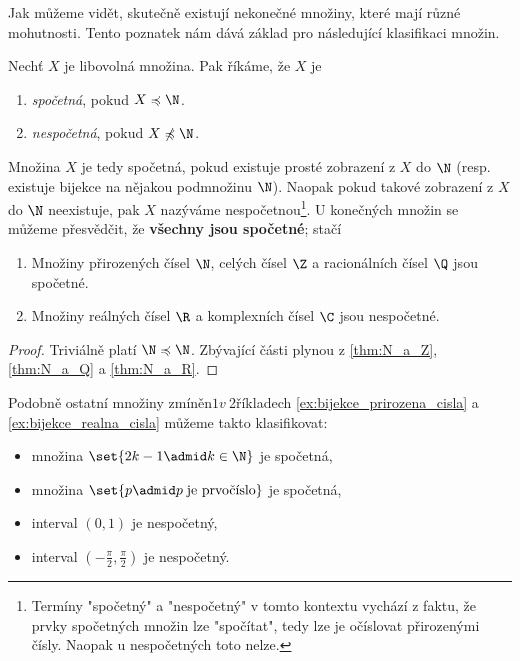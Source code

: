 \needspace{1cm}
Jak můžeme vidět, skutečně existují nekonečné množiny, které mají různé mohutnosti.  Tento poznatek nám dává základ pro následující klasifikaci množin.
\begin{definition}\label{def:spocetna_a_nespocetna_mnozina}
    Nechť $X$ je libovolná množina. Pak říkáme, že $X$ je
    \begin{enumerate}[label=(\roman*)]
        \item \emph{spočetná}, pokud $X\preccurlyeq\N$.
        \item \emph{nespočetná}, pokud $X\not\preccurlyeq\N$.
    \end{enumerate}
\end{definition}
Množina $X$ je tedy spočetná, pokud existuje prosté zobrazení z $X$ do $\N$ (resp. existuje bijekce na nějakou podmnožinu $\N$). Naopak pokud takové zobrazení z $X$ do $\N$ neexistuje, pak $X$ nazýváme nespočetnou\footnote{Termíny "spočetný" a "nespočetný" v tomto kontextu vychází z faktu, že prvky spočetných množin lze "spočítat", tedy lze je očíslovat přirozenými čísly. Naopak u nespočetných toto nelze.}. U konečných množin se můžeme přesvědčit, že \textbf{všechny jsou spočetné}; stačí 
\begin{theorem}\label{thm:spocetnost_ciselnych_oboru}
    \begin{enumerate}[label=(\roman*)]
        \item Množiny přirozených čísel $\N$, celých čísel $\Z$ a racionálních čísel $\Q$ jsou spočetné.
        \item Množiny reálných čísel $\R$ a komplexních čísel $\C$ jsou nespočetné.
    \end{enumerate}
\end{theorem}
\begin{proof}
    Triviálně platí $\N\preccurlyeq\N$. Zbývající části plynou z \ref{thm:N_a_Z}, \ref{thm:N_a_Q} a \ref{thm:N_a_R}.
\end{proof}
Podobně ostatní množiny zmíněn$1 v~$2říkladech \ref{ex:bijekce_prirozena_cisla} a \ref{ex:bijekce_realna_cisla} můžeme takto klasifikovat:
\begin{itemize}
    \item množina $\set{2k-1 \admid k\in\N}$ je spočetná,
    \item množina $\set{p \admid p\;\text{je prvočíslo}}$ je spočetná,
    \item interval $(0,1)$ je nespočetný,
    \item interval $\displaystyle\left(-\frac{\pi}{2},\frac{\pi}{2}\right)$ je nespočetný.
\end{itemize}
\medskip

